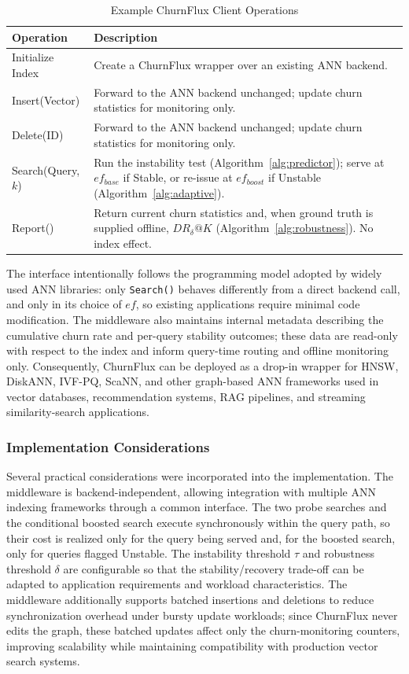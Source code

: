 \documentclass{ieeeaccess}
\begin{document}
\begin{table}[!t]
\centering
\caption{Example ChurnFlux Client Operations}
\label{tab:clientapi}
\begin{tabular}{p{3.2cm}p{4.8cm}}
\toprule
\textbf{Operation} & \textbf{Description} \\
\midrule
Initialize Index & Create a ChurnFlux wrapper over an existing ANN backend. \\
Insert(Vector) & Forward to the ANN backend unchanged; update churn statistics for monitoring only. \\
Delete(ID) & Forward to the ANN backend unchanged; update churn statistics for monitoring only. \\
Search(Query,$k$) & Run the instability test (Algorithm~\ref{alg:predictor}); serve at $ef_{base}$ if Stable, or re-issue at $ef_{boost}$ if Unstable (Algorithm~\ref{alg:adaptive}). \\
Report() & Return current churn statistics and, when ground truth is supplied offline, $DR_{\delta}@K$ (Algorithm~\ref{alg:robustness}). No index effect. \\
\bottomrule
\end{tabular}
\end{table}

The interface intentionally follows the programming model adopted by widely used ANN libraries: only \texttt{Search()} behaves differently from a direct backend call, and only in its choice of $ef$, so existing applications require minimal code modification. The middleware also maintains internal metadata describing the cumulative churn rate and per-query stability outcomes; these data are read-only with respect to the index and inform query-time routing and offline monitoring only. Consequently, ChurnFlux can be deployed as a drop-in wrapper for HNSW, DiskANN, IVF-PQ, ScaNN, and other graph-based ANN frameworks used in vector databases, recommendation systems, RAG pipelines, and streaming similarity-search applications.

\subsubsection{Implementation Considerations}
Several practical considerations were incorporated into the implementation. The middleware is backend-independent, allowing integration with multiple ANN indexing frameworks through a common interface. The two probe searches and the conditional boosted search execute synchronously within the query path, so their cost is realized only for the query being served and, for the boosted search, only for queries flagged Unstable. The instability threshold $\tau$ and robustness threshold $\delta$ are configurable so that the stability/recovery trade-off can be adapted to application requirements and workload characteristics. The middleware additionally supports batched insertions and deletions to reduce synchronization overhead under bursty update workloads; since ChurnFlux never edits the graph, these batched updates affect only the churn-monitoring counters, improving scalability while maintaining compatibility with production vector search systems.
\end{document}
